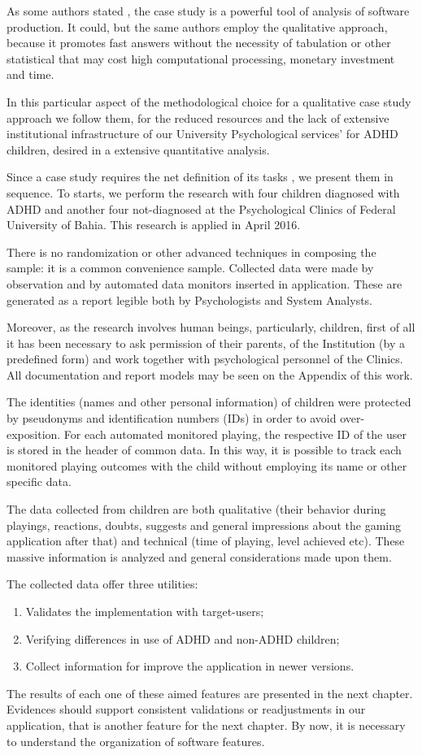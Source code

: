 As some authors stated \citep{Lauri-2011}, the case study is a powerful tool of analysis of software production. It could, but the same authors employ the qualitative approach, because it promotes fast answers without the necessity of tabulation or other statistical that may cost high computational processing, monetary investment and time. 

In this particular aspect of the methodological choice for a qualitative case study approach we follow them, for the reduced resources and the lack of extensive institutional infrastructure of our University Psychological services' for ADHD children, desired in a extensive quantitative analysis.

Since a case study requires the net definition of its tasks \citep{Lauri-2011}, we present them in sequence. To starts, we perform the research with four children diagnosed with ADHD and another four not-diagnosed at the Psychological Clinics of Federal University of Bahia. This research is applied in April 2016. 

There is no randomization or other advanced techniques in composing the sample: it is a common convenience sample. Collected data were made by observation and by automated data monitors inserted in application. These are generated as a report legible both by Psychologists and System Analysts.

Moreover, as the research involves human beings, particularly, children, first of all it has been necessary to ask permission of their parents, of the Institution (by a predefined form) and work together with psychological personnel of the Clinics. All documentation and report models may be seen on the Appendix of this work.

The identities (names and other personal information) of children were protected by pseudonyms and identification numbers (IDs)  in order to avoid over-exposition. For each automated monitored playing, the respective ID of the user is stored in the header of common data. In this way, it is possible to track each monitored playing outcomes with the child without employing its name or other specific data.

The data collected from children are both qualitative (their behavior during playings, reactions, doubts, suggests and general impressions about the gaming application after that) and technical (time of playing, level achieved etc). These massive information is analyzed and general considerations made upon them.

The collected data offer three utilities: 
\begin{enumerate}
\item Validates the implementation with target-users;
\item Verifying differences in use of ADHD and non-ADHD children;
\item Collect information for improve the application in newer versions.
\end{enumerate}
	
The results of each one of these aimed features are presented in the next chapter. Evidences should support consistent validations or readjustments in our application, that is another feature for the next chapter. By now, it is necessary to understand the organization of software features. 


